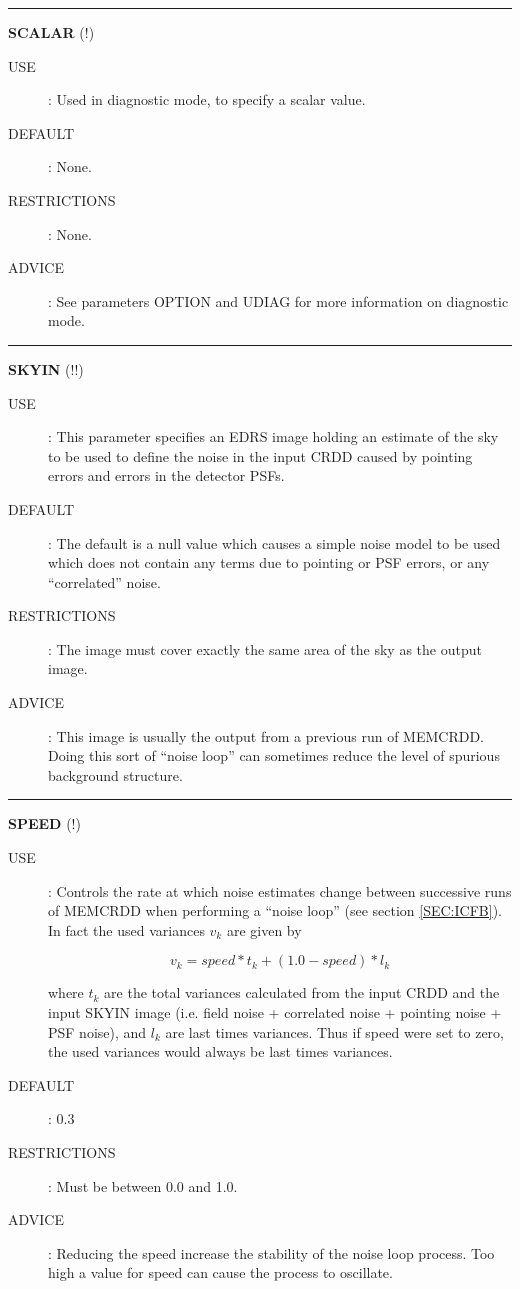 \rule{\textwidth}{0.3mm}
{\Large {\bf SCALAR} (!)}
\begin{description}
\item [USE]:
Used in diagnostic mode, to specify a scalar value.
\item [DEFAULT]:
None.
\item [RESTRICTIONS]:
None.
\item [ADVICE]:
See parameters OPTION and UDIAG for more information on diagnostic mode.
\end {description}

\rule{\textwidth}{0.3mm}
{\Large {\bf SKYIN} (!!)}
\begin{description}
\item [USE]:
This parameter specifies an EDRS image holding an estimate of the sky to be 
used to define the noise in the input CRDD caused by pointing errors and 
 errors in the detector PSFs.
\item [DEFAULT]:
The default is a null value which causes a simple noise model to be used which 
does not contain any terms due to pointing or PSF errors, or any ``correlated''
noise.
\item [RESTRICTIONS]:
The image must cover exactly the same area of the sky as the output image. 
\item [ADVICE]:
This image is usually the output from a previous run of MEMCRDD. Doing this sort 
of ``noise loop'' can sometimes reduce the level of spurious background 
structure.
\end {description}

\rule{\textwidth}{0.3mm}
{\Large {\bf SPEED } (!)}
\begin{description}
\item [USE]:
Controls the rate at which noise estimates change between 
successive runs of MEMCRDD when performing a ``noise loop'' (see section
\ref {SEC:ICFB}). In fact the used variances $v_{k}$ are given by

\begin {equation}
v_{k}=speed*t_{k}+(1.0-speed)*l_{k}
\end {equation}

where $t_{k}$ are the total variances calculated from the input CRDD and the 
input SKYIN image (i.e. field noise + correlated noise + pointing noise + PSF 
noise), and $l_{k}$ are last times variances. Thus if speed were set to zero, 
the used variances would always be last times variances. 
\item [DEFAULT]:
0.3
\item [RESTRICTIONS]:
Must be between 0.0 and 1.0.
\item [ADVICE]:
Reducing the speed increase the stability of the noise loop process. Too high a 
value for speed can cause the process to oscillate.
\end {description}


